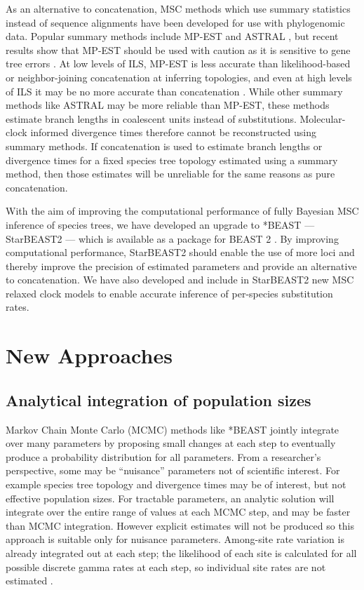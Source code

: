 \documentclass[nogrid]{MBE}%
\begin{document}
As an alternative to concatenation, MSC methods which use summary statistics instead
of sequence alignments have been developed for use with phylogenomic data.
Popular summary methods include MP-EST and ASTRAL \citep{Liu2010,
Mirarab01092014}, but recent results show that MP-EST should be used with caution as it is
sensitive to gene tree errors \citep{Mirarab15062015, Xi201563}. At low levels of
ILS, MP-EST is less accurate than likelihood-based or neighbor-joining concatenation at
inferring topologies, and even at high levels of ILS it may be no more accurate
than concatenation \citep{Ogilvie01052016}. While other summary methods like
ASTRAL may be more reliable than MP-EST, these methods estimate branch lengths
in coalescent units instead of substitutions. Molecular-clock informed divergence times therefore cannot be
reconstructed using summary methods. If concatenation is used to estimate branch
lengths or divergence times for a fixed species tree
topology estimated using a summary method, then those estimates will be
unreliable for the same reasons as pure concatenation.

With the aim of improving the computational performance of fully Bayesian
MSC inference of species trees, we have developed an upgrade
to *BEAST --- StarBEAST2 --- which is available as a package for BEAST 2
\citep{10.1371/journal.pcbi.1003537}. By improving computational performance,
StarBEAST2 should enable the use of more loci and thereby improve the precision
of estimated parameters and provide an alternative to concatenation. We have
also developed and include in StarBEAST2 new MSC relaxed
clock models to enable accurate inference of per-species substitution rates.

\section{New Approaches}

\subsection{Analytical integration of population sizes}

Markov Chain Monte Carlo (MCMC) methods like *BEAST jointly integrate
over many parameters by proposing small changes at each step to eventually
produce a probability distribution for all parameters. From a
researcher's perspective, some may be ``nuisance'' parameters not of scientific
interest. For example species tree topology and divergence times may be of
interest, but not effective population sizes. For tractable parameters, an
analytic solution will integrate over the entire range of values at each MCMC
step, and may be faster than MCMC integration. However explicit
estimates will not be produced so this approach is suitable only for nuisance
parameters. Among-site rate variation is already integrated out at each step;
the likelihood of each site is calculated for all possible discrete gamma rates
at each step, so individual site rates are not estimated \citep{Yang1994}.
\end{document}
